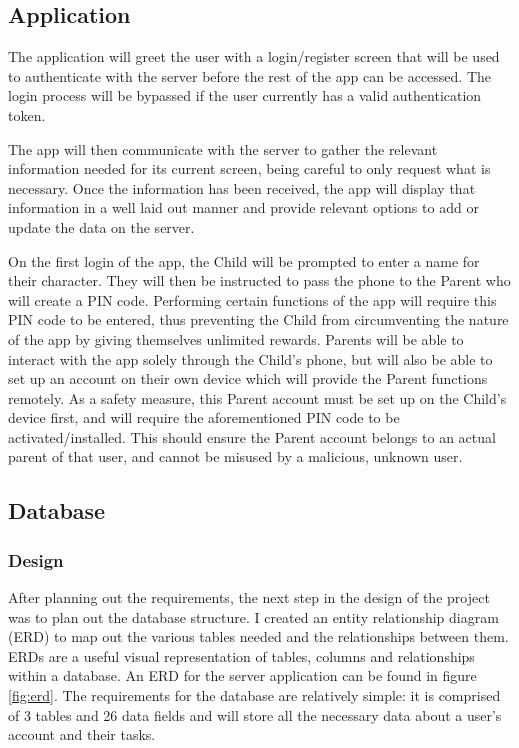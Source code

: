 \subsection{Application}
The application will greet the user with a login/register screen that will be used to authenticate with the server before the rest of the app can be accessed.
The login process will be bypassed if the user currently has a valid authentication token.

The app will then communicate with the server to gather the relevant information needed for its current screen, being careful to only request what is necessary.
Once the information has been received, the app will display that information in a well laid out manner and provide relevant options to add or update the data on the server.

On the first login of the app, the Child will be prompted to enter a name for their character. 
They will then be instructed to pass the phone to the Parent who will create a PIN code.
Performing certain functions of the app will require this PIN code to be entered, thus preventing the Child from circumventing the nature of the app by giving themselves unlimited rewards.
Parents will be able to interact with the app solely through the Child's phone, but will also be able to set up an account on their own device which will provide the Parent functions remotely.
As a safety measure, this Parent account must be set up on the Child's device first, and will require the aforementioned PIN code to be activated/installed. 
This should ensure the Parent account belongs to an actual parent of that user, and cannot be misused by a malicious, unknown user. 

\subsection{Database}
\subsubsection{Design}
After planning out the requirements, the next step in the design of the project was to plan out the database structure.
I created an entity relationship diagram (ERD) to map out the various tables needed and the relationships between them.
ERDs are a useful visual representation of tables, columns and relationships within a database.
An ERD for the server application can be found in figure \ref{fig:erd}.
The requirements for the database are relatively simple: it is comprised of 3 tables and 26 data fields and will store all the necessary data about a user's account and their tasks.

